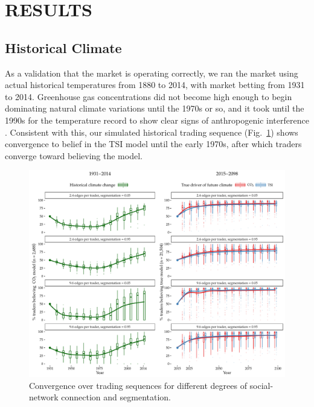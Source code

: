 \documentclass{article}\usepackage[]{graphicx}\usepackage[]{color}
\makeatletter
\def\maxwidth{ %
  \ifdim\Gin@nat@width>\linewidth
    \linewidth
  \else
    \Gin@nat@width
  \fi
}
\newenvironment{knitrout}{}{} %
\makeatother
\begin{document}
\section{RESULTS}

\subsection{Historical Climate}

As a validation that the market is operating correctly, we ran the market using actual historical temperatures from 1880 to 2014, with market betting from 1931 to 2014. Greenhouse gas concentrations did not become high enough to begin dominating natural climate variations until the 1970s or so, and it took until the 1990s for the temperature record to show clear signs of anthropogenic interference . Consistent with this, our simulated historical trading sequence (Fig.~\ref{fig:time}) shows convergence to belief in the TSI model until the early 1970s, after which traders converge toward believing the  model. 
\begin{knitrout}
\color{fgcolor}\begin{figure}[t]

{\centering \includegraphics[width=\maxwidth]{time-1} 

}

\caption[Convergence over trading sequences for different degrees of social-network connection and segmentation]{Convergence over trading sequences for different degrees of social-network connection and segmentation.}\label{fig:time}
\end{figure}


\end{knitrout}
\end{document}
